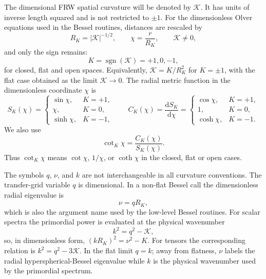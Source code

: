 \documentclass[11pt,a4paper]{article}
\newcommand{\dd}{\mathrm{d}}
\newcommand{\SK}{S_K}
\newcommand{\CK}{C_K}
\newcommand{\cotK}{\cot_K}
\newcommand{\abs}[1]{\left|#1\right|}
\newcommand{\sgn}{\operatorname{sgn}}
\begin{document}
The dimensional FRW spatial curvature will be denoted by \(\mathcal K\).  It has
units of inverse length squared and is not restricted to \(\pm1\).  For the
dimensionless Olver equations used in the Bessel routines, distances are
rescaled by
\begin{equation}
  R_K=\abs{\mathcal K}^{-1/2},\qquad \chi=\frac{r}{R_K},
  \qquad \mathcal K\ne0,
\end{equation}
and only the sign remains:
\begin{equation}
  K=\sgn(\mathcal K)=+1,0,-1,
\end{equation}
for closed, flat and open spaces.  Equivalently,
\(\mathcal K=K/R_K^2\) for \(K=\pm1\), with the flat case obtained as the
limit \(\mathcal K\to0\).  The radial metric function in the dimensionless
coordinate \(\chi\) is
\begin{equation}
  \SK(\chi)=
  \begin{cases}
    \sin\chi, & K=+1,\\
    \chi, & K=0,\\
    \sinh\chi, & K=-1,
  \end{cases}
  \qquad
  \CK(\chi)=\frac{\dd\SK}{\dd\chi}=
  \begin{cases}
    \cos\chi, & K=+1,\\
    1, & K=0,\\
    \cosh\chi, & K=-1.
  \end{cases}
\end{equation}
We also use
\begin{equation}
  \cotK\chi=\frac{\CK(\chi)}{\SK(\chi)}.
\end{equation}
Thus \(\cot_K\chi\) means \(\cot\chi\), \(1/\chi\), or \(\coth\chi\) in the closed, flat or open cases.

The symbols \(q\), \(\nu\), and \(k\) are not interchangeable in all curvature
conventions.  The transfer-grid variable \(q\) is dimensional.  In a non-flat
Bessel call the dimensionless radial eigenvalue is
\begin{equation}
  \nu=qR_K,
\end{equation}
which is also the argument name used by the low-level Bessel routines.  For
scalar spectra the primordial power is evaluated at the physical wavenumber
\begin{equation}
  k^2=q^2-\mathcal K,
\end{equation}
so, in dimensionless form, \((kR_K)^2=\nu^2-K\).  For tensors the corresponding
relation is \(k^2=q^2-3\mathcal K\).  In the flat limit \(q=k\); away from
flatness, \(\nu\) labels the radial hyperspherical-Bessel eigenvalue while
\(k\) is the physical wavenumber used by the primordial spectrum.
\end{document}
